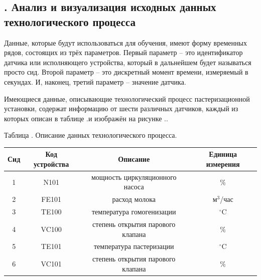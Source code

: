 \setcounter{chaptercntr}{3}


\titlespace

\subsection*{ 
  \gostTitleFont
  \redline
  \thechaptercntr .\thesubchaptercntr \spc
  Анализ и визуализация исходных данных технологического процесса
} \addtocounter{subchaptercntr}{1}

\subtitlespace

{\gostFont

  \par \redline Данные, которые будут использоваться для обучения, имеют форму временных рядов, состоящих из трёх параметров. Первый параметр {--} это идентификатор датчика или исполняющего устройства, который в дальнейшем будет называться просто сид. Второй параметр {--} это дискретный момент времени, измеряемый в секундах. И, наконец, третий параметр {--} значение датчика. 

  \par \redline Имеющиеся данные, описывающие технологический процесс пастеризационной установки, содержат информацию от шести различных датчиков, каждый из которых описан в таблице \thechaptercntr .\thetablecntr \spc и изображён на рисунке \thechaptercntr .\theimagecntr .

	\topTablespace
	{\begin{Center}
		\par Таблица \thechaptercntr .\thetablecntr \spc {--} Описание данных технологического процесса.

	\begin{tabular}{|c|c|c|c|}
		\hline
	  Сид & Код устройства & Описание & Единица измерения \\ \hline
		1 & N101 & мощность циркуляционного насоса & \% \\ \hline
		2 & FE101 & расход молока & м$^3$/час \\ \hline
		3 & TE100 & температура гомогенизации & $^\circ$C \\ \hline
		4 & VC100 & степень открытия парового клапана & \% \\ \hline
		5 & TE101 & температура пастеризации & $^\circ$C \\ \hline
		6 & VC101 & степень открытия парового клапана & \% \\ \hline
	\end{tabular} \end{Center}} 
	\botTablespace

}
